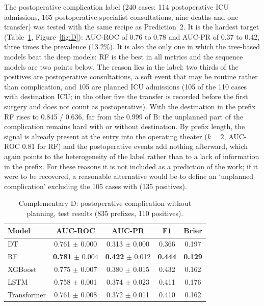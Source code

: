The postoperative complication label (240 cases: 114 postoperative ICU admissions, 165 postoperative specialist consultations, nine deaths and one transfer) was tested with the same recipe as Prediction~2. It is the hardest target (Table~\ref{tab:D}, Figure~\ref{fig:D}): AUC-ROC of 0.76 to 0.78 and AUC-PR of 0.37 to 0.42, three times the prevalence (13.2\%). It is also the only one in which the tree-based models beat the deep models: RF is the best in all metrics and the sequence models are two points below. The reason lies in the label: two thirds of the positives are postoperative consultations, a soft event that may be routine rather than complication, and 105 are planned ICU admissions (105 of the 110 cases with destination ICU; in the other five the transfer is recorded before the first surgery and does not count as postoperative). With the destination in the prefix RF rises to 0.845 / 0.636, far from the 0.999 of B: the unplanned part of the complication remains hard with or without destination. By prefix length, the signal is already present at the entry into the operating theater ($k=2$, AUC-ROC 0.81 for RF) and the postoperative events add nothing afterward, which again points to the heterogeneity of the label rather than to a lack of information in the prefix. For these reasons it is not included as a prediction of the work; if it were to be recovered, a reasonable alternative would be to define an `unplanned complication' excluding the 105 cases with  (135 positives).

\begin{table}[htbp]
\centering
\caption{Complementary D: postoperative complication without planning, test results (835 prefixes, 110 positives).}
\label{tab:D}
\begin{tabular}{lcccc}
\toprule
Model & AUC-ROC & AUC-PR & F1 & Brier \\
\midrule
DT & 0.761 $\pm$ 0.000 & 0.313 $\pm$ 0.000 & 0.366 & 0.197 \\
RF & \textbf{0.781} $\pm$ 0.004 & \textbf{0.422} $\pm$ 0.012 & \textbf{0.444} & \textbf{0.129} \\
XGBoost & 0.775 $\pm$ 0.007 & 0.380 $\pm$ 0.015 & 0.432 & 0.162 \\
LSTM & 0.758 $\pm$ 0.001 & 0.374 $\pm$ 0.023 & 0.411 & 0.176 \\
Transformer & 0.761 $\pm$ 0.008 & 0.372 $\pm$ 0.011 & 0.410 & 0.162 \\
\bottomrule
\end{tabular}
\end{table}

